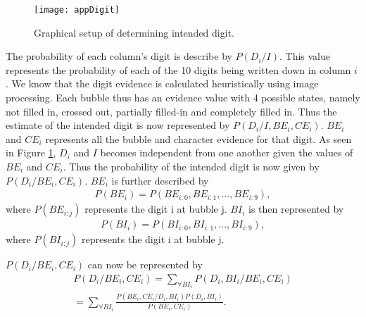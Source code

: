 \begin{figure}
  \centering
  \texttt{[image: appDigit]}\\
  \caption{Graphical setup of determining intended digit.}
  \label{fig:appDigit}
\end{figure}

The probability of each column's digit is describe by $P(D_i/I)$. This value represents the probability of each of the 10 digits being written down in column $i$ . We know that the digit evidence is calculated heuristically using image processing. Each bubble thus has an evidence value with 4 possible states, namely not filled in, crossed out, partially filled-in and completely filled in. Thus the estimate of the intended digit is now represented by $P(D_i/I,BE_i,CE_i)$. $BE_i$ and $CE_i$ represents all the bubble and character evidence for that digit. As seen in Figure \ref{fig:appDigit}, $D_i$ and $I$ becomes independent from one another given the values of $BE_i$ and $CE_i$. Thus the probability of the intended digit is now given by $P(D_i/BE_i,CE_i)$.
$BE_i$ is further described by 
\begin{align}
  P(BE_i) =  P(BE_{i:0},BE_{i:1},...,BE_{i:9}),
\label{eqn:ansIndep}
\end{align}
where  $P(BE_{i:j})$ represents the digit i at bubble j. $BI_i$ is then represented by
\begin{align}
  P(BI_i) =  P(BI_{i:0},BI_{i:1},...,BI_{i:9}),
\label{eqn:ansIndep}
\end{align}
where  $P(BI_{i:j})$ represents the digit i at bubble j.

$P(D_i/BE_i,CE_i)$ can now be represented by
\begin{align}
  P(D_i/BE_i,CE_i)	=  \sum_{\forall BI_i}^{}  P(D_i,BI_i/BE_i,CE_i)\\
  					=  \sum_{\forall BI_i}^{}  \frac{P(BE_i,CE_i/D_i,BI_i)P(D_i,BI_i)}{P(BE_i,CE_i)}.
\label{eqn:ansEqn2}
\end{align}

